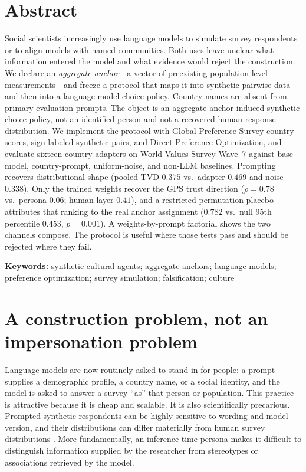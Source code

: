 \documentclass[10pt,letterpaper]{article}
\begin{document}
\section*{Abstract}
Social scientists increasingly use language models to simulate survey respondents or to align models with named communities. Both uses leave unclear what information entered the model and what evidence would reject the construction. We declare an \emph{aggregate anchor}---a vector of preexisting population-level measurements---and freeze a protocol that maps it into synthetic pairwise data and then into a language-model choice policy. Country names are absent from primary evaluation prompts. The object is an aggregate-anchor-induced synthetic choice policy, not an identified person and not a recovered human response distribution. We implement the protocol with Global Preference Survey country scores, sign-labeled synthetic pairs, and Direct Preference Optimization, and evaluate sixteen country adapters on World Values Survey Wave~7 against base-model, country-prompt, uniform-noise, and non-LLM baselines. Prompting recovers distributional shape (pooled TVD $0.375$ vs.\ adapter $0.469$ and noise $0.338$). Only the trained weights recover the GPS trust direction ($\rho=0.78$ vs.\ persona $0.06$; human layer $0.41$), and a restricted permutation placebo attributes that ranking to the real anchor assignment ($0.782$ vs.\ null 95th percentile $0.453$, $p=0.001$). A weights-by-prompt factorial shows the two channels compose. The protocol is useful where those tests pass and should be rejected where they fail.

\noindent\textbf{Keywords:} synthetic cultural agents; aggregate anchors; language models; preference optimization; survey simulation; falsification; culture

\section{A construction problem, not an impersonation problem}
Language models are now routinely asked to stand in for people: a prompt supplies a demographic profile, a country name, or a social identity, and the model is asked to answer a survey ``as'' that person or population. This practice is attractive because it is cheap and scalable. It is also scientifically precarious. Prompted synthetic respondents can be highly sensitive to wording and model version, and their distributions can differ materially from human survey distributions \cite{argyle2023,bisbee2024,dalloul2026}. More fundamentally, an inference-time persona makes it difficult to distinguish information supplied by the researcher from stereotypes or associations retrieved by the model.
\end{document}
